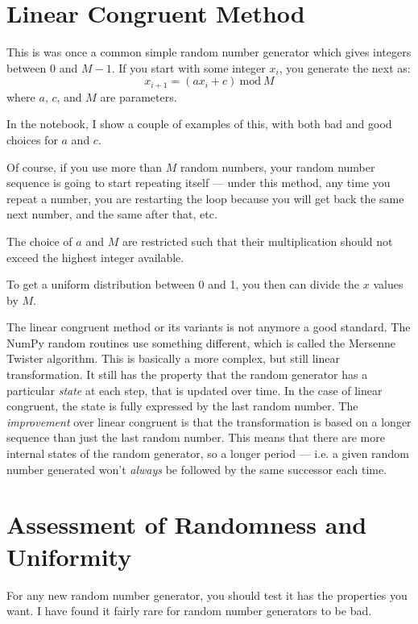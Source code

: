 \section{Linear Congruent Method}

This is was once a common simple random number generator which gives
integers between 0 and $M-1$. If you start with some integer $x_i$,
you generate the next as:
\begin{equation}
x_{i+1} = (a x_i +c) \mathrm{~mod~} M
\end{equation}
where $a$, $c$, and $M$ are parameters. 

In the notebook, I show a couple of examples of this, with both bad
and good choices for $a$ and $c$.

Of course, if you use more than $M$ random numbers, your random number
sequence is going to start repeating itself --- under this method, any
time you repeat a number, you are restarting the loop because you will
get back the same next number, and the same after that, etc.

The choice of $a$ and $M$ are restricted such that their
multiplication should not exceed the highest integer available.

To get a uniform distribution between 0 and 1, you then can divide the
$x$ values by $M$.

The linear congruent method or its variants is not anymore a good
standard. The NumPy random routines use something different, which is
called the Mersenne Twister algorithm. This is basically a more
complex, but still linear transformation. It still has the property
that the random generator has a particular {\it state} at each step,
that is updated over time. In the case of linear congruent, the state
is fully expressed by the last random number. The {\it improvement}
over linear congruent is that the transformation is based on a longer
sequence than just the last random number. This means that there are
more internal states of the random generator, so a longer period ---
i.e. a given random number generated won't {\it always} be followed by
the same successor each time.

\section{Assessment of Randomness and Uniformity}

For any new random number generator, you should test it has the
properties you want. I have found it fairly rare for random number
generators to be bad.

